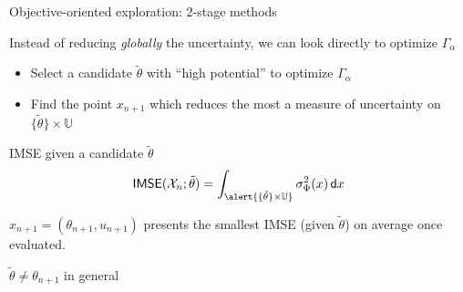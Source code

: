 \documentclass[10pt,aspectratio=169,usepdftitle=false]{beamer}
\newcommand{\Uspace}{\mathbb{U}}
\newcommand{\kk}{\theta}
\newcommand{\uu}{u}
\begin{document}
\begin{frame}{Objective-oriented exploration: 2-stage methods}
  
  Instead of reducing \emph{globally} the uncertainty, we can look directly to optimize $\Gamma_{\alpha}$
  \begin{itemize}
  \item Select a candidate $\tilde{\kk}$ with ``high potential'' to optimize $\Gamma_{\alpha}$
  \item Find the point $x_{n+1}$ which reduces the most a measure of uncertainty on $\{\tilde{\kk} \} \times \Uspace$
  \end{itemize}
  \begin{block}{IMSE given a candidate $\tilde{\kk}$}
  \begin{equation}
    \mathsf{IMSE}(\mathcal{X}_n; \tilde{\kk}) = \int_{\alert{\{\tilde{\kk}\}\times \Uspace}} \sigma^2_\Phi(x) \,\mathsf{d}x
  \end{equation}
\end{block}
$x_{n+1}=(\kk_{n+1}, \uu_{n+1})$ presents the smallest IMSE (given $\tilde{\kk}$) on average once evaluated.

$\tilde{\kk} \neq \kk_{n+1}$ in general
\end{frame}
\end{document}
